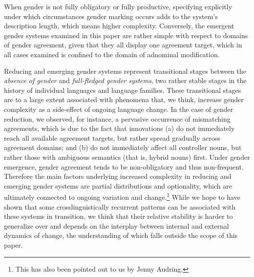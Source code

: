 \documentclass[output=collectionpaper]{langsci/langscibook}
\begin{document}
\z

When gender is not fully obligatory or fully productive, specifying explicitly under which circumstances gender marking occurs adds to the system's description length, which means higher complexity. Conversely, the emergent gender systems examined in this paper are rather simple with respect to domains of gender agreement, given that they all display one agreement target, which in all cases examined is confined to the domain of adnominal modification.

Reducing and emerging gender systems represent transitional stages between the \textit{absence of gender} and \textit{full-fledged gender systems}, two rather stable stages in the history of individual languages and language families. These transitional stages are to a large extent associated with phenomena that, we think, increase gender complexity as a side-effect of ongoing language change. In the case of gender reduction, we observed, for instance, a pervasive occurrence of mismatching agreements, which is due to the fact that innovations (a) do not immediately reach all available agreement targets, but rather spread gradually across agreement domains; and (b) do not immediately affect all controller nouns, but rather those with ambiguous semantics (that is, hybrid nouns) first. Under gender emergence, gender agreement tends to be non-obligatory and thus non-frequent. Therefore the main factors underlying increased complexity in reducing and emerging gender systems are partial distributions and optionality, which are ultimately connected to ongoing variation and change.\footnote{This has also been pointed out to us by Jenny Audring.} While we hope to have shown that some crosslinguistically recurrent patterns can be associated with these systems in transition, we think that their relative stability is harder to generalize over and depends on the interplay between internal and external dynamics of change, the understanding of which falls outside the scope of this paper.


\end{document}

